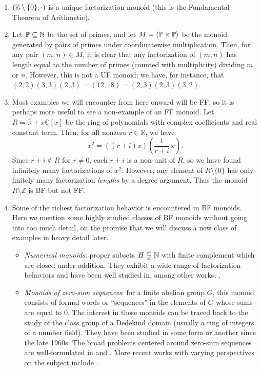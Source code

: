 \begin{enumerate}[label={\rm (\roman{*})}]
\item $(\mathbb{Z}\setminus \{0\},\cdot)$ is a unique factorization monoid (this is the Fundamental Theorem of Arithmetic).
\item Let $\mathbb{P} \subseteq \mathbb{N}$ be the set of primes, and let $M = \langle \mathbb{P}\times \mathbb{P} \rangle$ be the monoid generated by pairs of primes under coordinatewise multiplication.  
Then, for any pair $(m,n)\in M$, it is clear that any factorization of $(m,n)$ has length equal to the number of primes (counted with multiplicity) dividing $m$ or $n$.
However, this is not a UF monoid; we have, for instance, that $(2,2)(3,3)(2,3) = (12,18) = (2,3)(2,3)(3,2)$.
\item Most examples we will encounter from here onward will be FF, so it is perhaps more useful to see a non-example of an FF monoid.
Let $R = \mathbb{R} + x \mathbb{C}[x]$ be the ring of polynomials with complex coefficients and real constant term.
Then, for all nonzero $r\in \mathbb{R}$, we have
\[ x^2 = ((r+i)x)\left(\frac{1}{r+i}\,x\right). \]
Since $r+i\notin R$ for $r\neq0$, each $r+i$ is a non-unit of $R$, so we have found infinitely many factorizations of $x^2$.
However, any element of $R\setminus \{0\}$ has only finitely many factorization \textit{lengths} by a degree argument.
Thus the monoid $R\setminus \mathbb{Z}$ is BF but not FF.
\item Some of the richest factorization behavior is encountered in BF monoids.  
Here we mention some highly studied classes of BF monoids without going into too much detail, on the promise that we will discuss a new class of examples in heavy detail later.
\begin{itemize}
\item \textit{Numerical monoids}: proper subsets $H \subsetneqq \mathbb{N}$ with finite complement which are closed under addition. 
They exhibit a wide range of factorization behaviors and have been well studied in, among other works, \cite{oneill-pelayo17,oneill-pelayo18,barron-oneill-pelayo17,geroldinger-schmid18,conaway-etal18}.
\item \textit{Monoids of zero-sum sequences}: for a finite abelian group $G$, this monoid consists of formal words or ``sequences" in the elements of $G$ whose sums are equal to $0$.  
The interest in these monoids can be traced back to the study of the class group of a Dedekind domain (usually a ring of integers of a number field).  They have been studied in some form or another since the late 1960s.
The broad problems centered around zero-sum sequences are well-formulated in \cite{gao-geroldinger06} and \cite{geroldinger-hk06}.
More recent works with varying perspectives on the subject include \cite{gao-al18,savchev-chen17,girard-schmid19,girard-schmid20}.


\end{itemize}
\end{enumerate}
